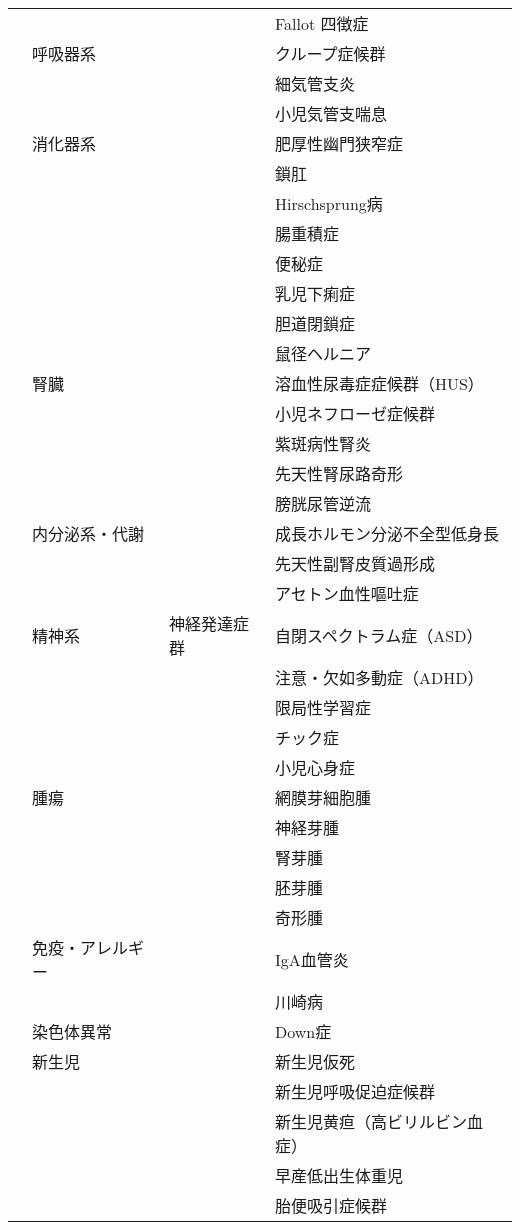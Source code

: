 \begin{xltabular}{\linewidth}{XXXX}
 &  &  & Fallot 四徴症 \\
 & 呼吸器系 &  & クループ症候群 \\
 &  &  & 細気管支炎 \\
 &  &  & 小児気管支喘息 \\
 & 消化器系 &  & 肥厚性幽門狭窄症 \\
 &  &  & 鎖肛 \\
 &  &  & Hirschsprung病 \\
 &  &  & 腸重積症 \\
 &  &  & 便秘症 \\
 &  &  & 乳児下痢症 \\
 &  &  & 胆道閉鎖症 \\
 &  &  & 鼠径ヘルニア \\
 & 腎臓 &  & 溶血性尿毒症症候群（HUS） \\
 &  &  & 小児ネフローゼ症候群 \\
 &  &  & 紫斑病性腎炎 \\
 &  &  & 先天性腎尿路奇形 \\
 &  &  & 膀胱尿管逆流 \\
 & 内分泌系・代謝 &  & 成長ホルモン分泌不全型低身長 \\
 &  &  & 先天性副腎皮質過形成 \\
 &  &  & アセトン血性嘔吐症 \\
 & 精神系 & 神経発達症群 & 自閉スペクトラム症（ASD） \\
 &  &  & 注意・欠如多動症（ADHD） \\
 &  &  & 限局性学習症 \\
 &  &  & チック症 \\
 &  &  & 小児心身症 \\
 & 腫瘍 &  & 網膜芽細胞腫 \\
 &  &  & 神経芽腫 \\
 &  &  & 腎芽腫 \\
 &  &  & 胚芽腫 \\
 &  &  & 奇形腫 \\
 & 免疫・アレルギー &  & IgA血管炎 \\
 &  &  & 川崎病 \\
 & 染色体異常 &  & Down症 \\
 & 新生児 &  & 新生児仮死 \\
 &  &  & 新生児呼吸促迫症候群 \\
 &  &  & 新生児黄疸（高ビリルビン血症） \\
 &  &  & 早産低出生体重児 \\
 &  &  & 胎便吸引症候群 \\

\end{xltabular}
